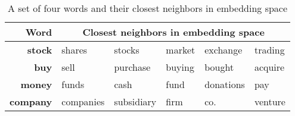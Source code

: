 \begin{table}[!ht]
\centering

\begin{tabular}{rlllll}
\toprule
\textbf{Word} & \multicolumn{5}{c}{\textbf{Closest neighbors in embedding space}}\\
\midrule

\textbf{stock} & shares & stocks & market & exchange & trading\\
\textbf{buy} & sell & purchase & buying & bought & acquire\\
\textbf{money} & funds & cash & fund & donations & pay\\
\textbf{company} & companies & subsidiary & firm & co. & venture\\

\bottomrule
\end{tabular}
\caption{A set of four words and their closest neighbors in embedding space}
\label{table-glove-demo}
\end{table}